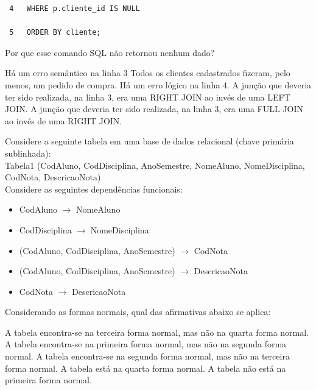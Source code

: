 \documentclass[12pt, addpoints]{exam}
\begin{document}
\begin{questions}
\begin{tcolorbox}
\begin{verbatim}
 4   WHERE p.cliente_id IS NULL

 5   ORDER BY cliente;

 \end{verbatim}

\end{tcolorbox}

Por que esse comando SQL não retornou nenhum dado?


\begin{choices}
\choice Há um erro semântico na linha 3
\choice Todos os clientes cadastrados fizeram, pelo menos, um pedido de compra.
\choice Há um erro lógico na linha 4.
\choice A junção que deveria ter sido realizada, na linha 3, era uma RIGHT JOIN ao invés de uma LEFT JOIN.
\choice A junção que deveria ter sido realizada, na linha 3, era uma FULL JOIN ao invés de uma RIGHT JOIN.
\end{choices}

\question

Considere a seguinte tabela em uma base de dados relacional (chave primária sublinhada):\\

Tabela1 (CodAluno, CodDisciplina, AnoSemestre, NomeAluno, NomeDisciplina, CodNota, DescricaoNota)\\

Considere as seguintes dependências funcionais:

\begin{itemize}

    \item CodAluno \(\rightarrow\) NomeAluno

    \item CodDisciplina \(\rightarrow\) NomeDisciplina

    \item (CodAluno, CodDisciplina, AnoSemestre) \(\rightarrow\) CodNota

    \item (CodAluno, CodDisciplina, AnoSemestre) \(\rightarrow\) DescricaoNota

    \item CodNota \(\rightarrow\) DescricaoNota

\end{itemize}



Considerando as formas normais, qual das afirmativas abaixo se aplica:
\begin{choices}
\choice A tabela encontra-se na terceira forma normal, mas não na quarta forma normal.
\choice A tabela encontra-se na primeira forma normal, mas não na segunda forma normal.
\choice A tabela encontra-se na segunda forma normal, mas não na terceira forma normal.
\choice A tabela está na quarta forma normal.
\choice A tabela não está na primeira forma normal.
\end{choices}


\end{questions}
\end{document}
